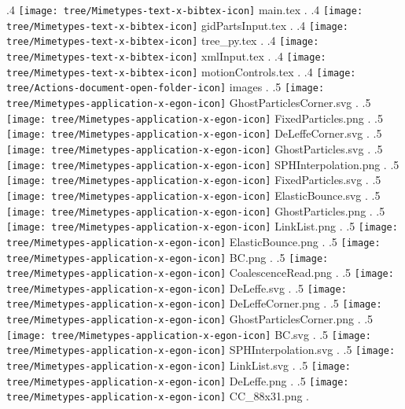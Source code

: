 {.4 { \texttt{[image: tree/Mimetypes-text-x-bibtex-icon]} main.tex }.
.4 { \texttt{[image: tree/Mimetypes-text-x-bibtex-icon]} gidPartsInput.tex }.
.4 { \texttt{[image: tree/Mimetypes-text-x-bibtex-icon]} tree\_py.tex }.
.4 { \texttt{[image: tree/Mimetypes-text-x-bibtex-icon]} xmlInput.tex }.
.4 { \texttt{[image: tree/Mimetypes-text-x-bibtex-icon]} motionControls.tex }.
.4 { \texttt{[image: tree/Actions-document-open-folder-icon]} images }.
.5 { \texttt{[image: tree/Mimetypes-application-x-egon-icon]} GhostParticlesCorner.svg }.
.5 { \texttt{[image: tree/Mimetypes-application-x-egon-icon]} FixedParticles.png }.
.5 { \texttt{[image: tree/Mimetypes-application-x-egon-icon]} DeLeffeCorner.svg }.
.5 { \texttt{[image: tree/Mimetypes-application-x-egon-icon]} GhostParticles.svg }.
.5 { \texttt{[image: tree/Mimetypes-application-x-egon-icon]} SPHInterpolation.png }.
.5 { \texttt{[image: tree/Mimetypes-application-x-egon-icon]} FixedParticles.svg }.
.5 { \texttt{[image: tree/Mimetypes-application-x-egon-icon]} ElasticBounce.svg }.
.5 { \texttt{[image: tree/Mimetypes-application-x-egon-icon]} GhostParticles.png }.
.5 { \texttt{[image: tree/Mimetypes-application-x-egon-icon]} LinkList.png }.
.5 { \texttt{[image: tree/Mimetypes-application-x-egon-icon]} ElasticBounce.png }.
.5 { \texttt{[image: tree/Mimetypes-application-x-egon-icon]} BC.png }.
.5 { \texttt{[image: tree/Mimetypes-application-x-egon-icon]} CoalescenceRead.png }.
.5 { \texttt{[image: tree/Mimetypes-application-x-egon-icon]} DeLeffe.svg }.
.5 { \texttt{[image: tree/Mimetypes-application-x-egon-icon]} DeLeffeCorner.png }.
.5 { \texttt{[image: tree/Mimetypes-application-x-egon-icon]} GhostParticlesCorner.png }.
.5 { \texttt{[image: tree/Mimetypes-application-x-egon-icon]} BC.svg }.
.5 { \texttt{[image: tree/Mimetypes-application-x-egon-icon]} SPHInterpolation.svg }.
.5 { \texttt{[image: tree/Mimetypes-application-x-egon-icon]} LinkList.svg }.
.5 { \texttt{[image: tree/Mimetypes-application-x-egon-icon]} DeLeffe.png }.
.5 { \texttt{[image: tree/Mimetypes-application-x-egon-icon]} CC\_88x31.png }.
}
